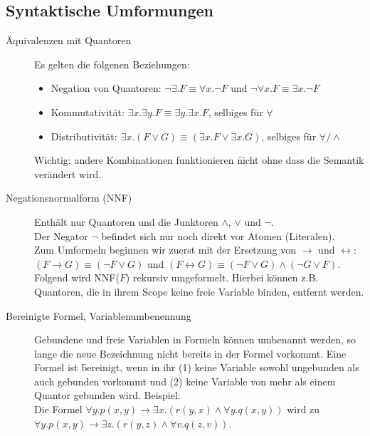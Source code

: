 \subsection{Syntaktische Umformungen}
    \begin{description}
        \item[Äquivalenzen mit Quantoren] Es gelten die folgenen Beziehungen: 
            \begin{itemize}
                \item Negation von Quantoren: $\neg\exists.F \equiv \forall x.\neg F$ und $\neg\forall x.F \equiv \exists x.\neg F$
                \item Kommutativität: $\exists x. \exists y.F \equiv \exists y. \exists x.F$, selbiges für $\forall${}
                \item Distributivität: $\exists x.(F \lor G) \equiv (\exists x.F \lor \exists x.G)$, selbiges für $\forall / \land$
            \end{itemize}
            Wichtig: andere Kombinationen funktionieren \f{nicht} ohne dass die Semantik verändert wird.

        \item[Negationsnormalform (NNF)] Enthält nur Quantoren und die Junktoren $\land$, $\lor$ und $\neg$. \\
            Der Negator $\neg$ befindet sich nur noch direkt vor Atomen (Literalen). \\
            Zum Umformeln beginnen wir zuerst mit der Ersetzung von $\to$ und $\leftrightarrow$: \\
            $(F \to G) \equiv (\neg F \lor G)$ und $(F \leftrightarrow G) \equiv (\neg F \lor G) \land (\neg G \lor F)$. \\
            Folgend wird NNF($F$) rekursiv umgeformelt. Hierbei können z.B. Quantoren, die in ihrem Scope keine freie Variable binden, entfernt werden.

        \item[Bereinigte Formel, Variablenumbenennung] Gebundene und freie Variablen in Formeln können umbenannt werden, so lange die neue Bezeichnung nicht bereits in der Formel vorkommt. Eine Formel ist \f{bereinigt}, wenn in ihr (1) keine Variable sowohl ungebunden als auch gebunden vorkommt und (2) keine Variable von mehr als einem Quantor gebunden wird. Beispiel: \\
            Die Formel $\forall y.p(x,y) \to \exists x.(r(y,x) \land \forall y.q(x,y))$ wird zu $\forall y.p(x,y) \to \exists z.(r(y,z) \land \forall v.q(z,v))$.


\end{description}
